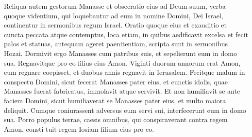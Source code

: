 \begin{biblechapter}
\verse Reliqua autem gestorum Manasse et obsecratio eius ad Deum suum, verba quoque videntium, qui loquebantur ad eum in nomine Domini, Dei Israel, continentur in sermonibus regum Israel. 
\verse Oratio quoque eius et exauditio et cuncta peccata atque contemptus, loca etiam, in quibus aedificavit excelsa et fecit palos et statuas, antequam ageret paenitentiam, scripta sunt in sermonibus Hozai. 
\verse Dormivit ergo Manasses cum patribus suis, et sepelierunt eum in domo sua. Regnavitque pro eo filius eius Amon. 
\verse Viginti duorum annorum erat Amon, cum regnare coepisset, et duobus annis regnavit in Ierusalem. 
\verse Fecitque malum in conspectu Domini, sicut fecerat Manasses pater eius, et cunctis idolis, quae Manasses fuerat fabricatus, immolavit atque servivit. 
\verse Et non humiliavit se ante faciem Domini, sicut humiliaverat se Manasses pater eius, et multo maiora deliquit. 
\verse Cumque coniurassent adversus eum servi sui, interfecerunt eum in domo sua. 
\verse Porro populus terrae, caesis omnibus, qui conspiraverant contra regem Amon, consti tuit regem Iosiam filium eius pro eo. 
\end{biblechapter}

